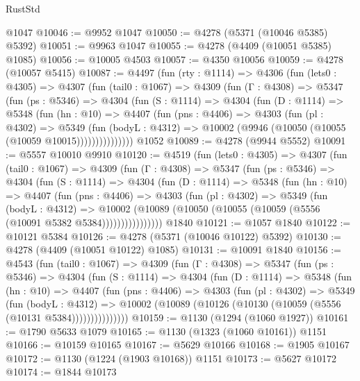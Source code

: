 \begin{lexlean}{RustStd}
\begin{coremodule}
{\begin{coremodule}
{{{{{{{{{{{{{{{{{{{{{{{{{{{{{{{{{{{    @1047
@10046 := @9952 @1047
@10050 := @4278 (@5371 (@10046 @5385) @5392)
@10051 := @9963 @1047
@10055 := @4278 (@4409 (@10051 @5385) @1085)
@10056 := @10005 @4503
@10057 := @4350 @10056
@10059 := @4278 (@10057 @5415)
@10087 := @4497
    (fun (rty : @1114) =>
    @4306
      (fun (lets0 : @4305) =>
      @4307
        (fun (tail0 : @1067) =>
        @4309
          (fun (Γ : @4308) =>
          @5347
            (fun (ps : @5346) =>
            @4304
              (fun (S : @1114) =>
              @4304
                (fun (D : @1114) =>
                @5348
                  (fun (hn : @10) =>
                  @4407
                    (fun (pns : @4406) =>
                    @4303
                      (fun (pl : @4302) =>
                      @5349
                        (fun (bodyL : @4312) =>
                        @10002 (@9946 (@10050 (@10055 (@10059 @10015)))))))))))))))
    @1052
@10089 := @4278 (@9944 @5552)
@10091 := @5557 @10010 @9910
@10120 := @4519
    (fun (lets0 : @4305) =>
    @4307
      (fun (tail0 : @1067) =>
      @4309
        (fun (Γ : @4308) =>
        @5347
          (fun (ps : @5346) =>
          @4304
            (fun (S : @1114) =>
            @4304
              (fun (D : @1114) =>
              @5348
                (fun (hn : @10) =>
                @4407
                  (fun (pns : @4406) =>
                  @4303
                    (fun (pl : @4302) =>
                    @5349
                      (fun (bodyL : @4312) =>
                      @10002
                        (@10089 (@10050 (@10055 (@10059 (@5556 (@10091 @5382 @5384))))))))))))))))
    @1840
@10121 := @1057 @1840
@10122 := @10121 @5384
@10126 := @4278 (@5371 (@10046 @10122) @5392)
@10130 := @4278 (@4409 (@10051 @10122) @1085)
@10131 := @10091 @1840
@10156 := @4543
    (fun (tail0 : @1067) =>
    @4309
      (fun (Γ : @4308) =>
      @5347
        (fun (ps : @5346) =>
        @4304
          (fun (S : @1114) =>
          @4304
            (fun (D : @1114) =>
            @5348
              (fun (hn : @10) =>
              @4407
                (fun (pns : @4406) =>
                @4303
                  (fun (pl : @4302) =>
                  @5349
                    (fun (bodyL : @4312) =>
                    @10002 (@10089 (@10126 (@10130 (@10059 (@5556 (@10131 @5384)))))))))))))))
@10159 := @1130 (@1294 (@1060 @1927))
@10161 := @1790 @5633 @1079
@10165 := @1130 (@1323 (@1060 @10161)) @1151
@10166 := @10159 @10165
@10167 := @5629 @10166
@10168 := @1905 @10167
@10172 := @1130 (@1224 (@1903 @10168)) @1151
@10173 := @5627 @10172
@10174 := @1844 @10173
}}}}}}}}}}}}}}}}}}}}}}}}}}}}}}}}}}}
\end{coremodule}}
\end{coremodule}
\end{lexlean}
